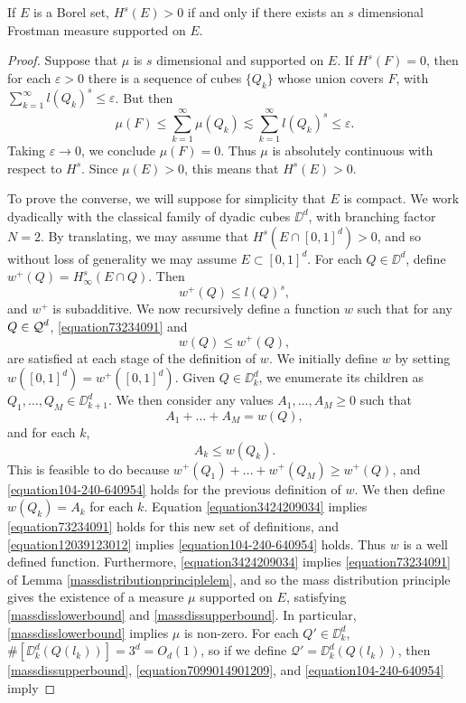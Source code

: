 \begin{theorem}
	If $E$ is a Borel set, $H^s(E) > 0$ if and only if there exists an $s$ dimensional Frostman measure supported on $E$.
\end{theorem}
\begin{proof}
	Suppose that $\mu$ is $s$ dimensional and supported on $E$. If $H^s(F) = 0$, then for each $\varepsilon > 0$ there is a sequence of cubes $\{ Q_k \}$ whose union covers $F$, with $\sum_{k = 1}^\infty l(Q_k)^s \leq \varepsilon$. But then
	\[ \mu(F) \leq \sum_{k = 1}^\infty \mu(Q_k) \lesssim \sum_{k = 1}^\infty l(Q_k)^s \leq \varepsilon. \]
	Taking $\varepsilon \to 0$, we conclude $\mu(F) = 0$. Thus $\mu$ is absolutely continuous with respect to $H^s$. Since $\mu(E) > 0$, this means that $H^s(E) > 0$.

	To prove the converse, we will suppose for simplicity that $E$ is compact. We work dyadically with the classical family of dyadic cubes $\DD^d$, with branching factor $N = 2$.  By translating, we may assume that $H^s(E \cap [0,1]^d) > 0$, and so without loss of generality we may assume $E \subset [0,1]^d$. For each $Q \in \DD^d$, define $w^+(Q) = H^s_\infty(E \cap Q)$. Then
	\begin{equation} \label{equation7099014901209} w^+(Q) \leq l(Q)^s, \end{equation}
	and $w^+$ is subadditive. We now recursively define a function $w$ such that for any $Q \in \operatorname{\mathcal{Q}}^d$, \eqref{equation73234091} and
	\begin{equation} \label{equation104-240-640954} w(Q) \leq w^+(Q), \end{equation}
	are satisfied at each stage of the definition of $w$. We initially define $w$ by setting $w([0,1]^d) = w^+([0,1]^d)$. Given $Q \in \DD_k^d$, we enumerate its children as $Q_1, \dots, Q_M \in \DD_{k+1}^d$. We then consider any values $A_1, \dots, A_M \geq 0$ such that
  	\begin{equation} \label{equation3424209034}
  		A_1 + \dots + A_M = w(Q),
  	\end{equation}
  	and for each $k$,
  	\begin{equation} \label{equation12039123012}
  		A_k \leq w(Q_k).
  	\end{equation}
	This is feasible to do because $w^+(Q_1) + \dots + w^+(Q_M) \geq w^+(Q)$, and \eqref{equation104-240-640954} holds for the previous definition of $w$. We then define $w(Q_k) = A_k$ for each $k$. Equation \eqref{equation3424209034} implies \eqref{equation73234091} holds for this new set of definitions, and \eqref{equation12039123012} implies \eqref{equation104-240-640954} holds. Thus $w$ is a well defined function. Furthermore, \eqref{equation3424209034} implies \eqref{equation73234091} of Lemma \ref{massdistributionprinciplelem}, and so the mass distribution principle gives the existence of a measure $\mu$ supported on $E$, satisfying \eqref{massdisslowerbound} and \eqref{massdissupperbound}. In particular, \eqref{massdisslowerbound} implies $\mu$ is non-zero. For each $Q' \in \DD_k^d$, $\#[\DD_k^d(Q(l_k))] = 3^d = O_d(1)$, so if we define $\mathcal{Q}' = \DD_k^d(Q(l_k))$, then \eqref{massdissupperbound}, \eqref{equation7099014901209}, and \eqref{equation104-240-640954} imply

\end{proof}
